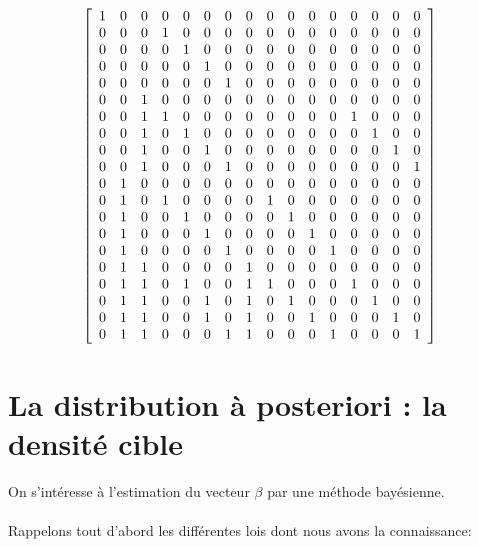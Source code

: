 \documentclass[french,12pt]{report}
\newcommand{\<}{\langle}
\renewcommand{\>}{\rangle}
\theoremstyle{definition}
\begin{document}
$$
\left[
\begin{array}{*{16}c}
 1 & 0 & 0 & 0 & 0 & 0 & 0 & 0 & 0 & 0 & 0 & 0 & 0 & 0 & 0 & 0  \\
 0 & 0 & 0 & 1 & 0 & 0 & 0 & 0 & 0 & 0 & 0 & 0 & 0 & 0 & 0 & 0 \\
 0 & 0 & 0 & 0 & 1 & 0 & 0 & 0 & 0 & 0 & 0 & 0 & 0 & 0 & 0 & 0 \\
 0 & 0 & 0 & 0 & 0 & 1 & 0 & 0 & 0 & 0 & 0 & 0 & 0 & 0 & 0 & 0 \\
 0 & 0 & 0 & 0 & 0 & 0 & 1 & 0 & 0 & 0 & 0 & 0 & 0 & 0 & 0 & 0 \\
 0 & 0 & 1 & 0 & 0 & 0 & 0 & 0 & 0 & 0 & 0 & 0 & 0 & 0 & 0 & 0 \\
 0 & 0 & 1 & 1 & 0 & 0 & 0 & 0 & 0 & 0 & 0 & 0 & 1 & 0 & 0 & 0 \\
 0 & 0 & 1 & 0 & 1 & 0 & 0 & 0 & 0 & 0 & 0 & 0 & 0 & 1 & 0 & 0 \\
 0 & 0 & 1 & 0 & 0 & 1 & 0 & 0 & 0 & 0 & 0 & 0 & 0 & 0 & 1 & 0 \\
 0 & 0 & 1 & 0 & 0 & 0 & 1 & 0 & 0 & 0 & 0 & 0 & 0 & 0 & 0 & 1 \\
 0 & 1 & 0 & 0 & 0 & 0 & 0 & 0 & 0 & 0 & 0 & 0 & 0 & 0 & 0 & 0  \\
 0 & 1 & 0 & 1 & 0 & 0 & 0 & 0 & 1 & 0 & 0 & 0 & 0 & 0 & 0 & 0  \\
 0 & 1 & 0 & 0 & 1 & 0 & 0 & 0 & 0 & 1 & 0 & 0 & 0 & 0 & 0 & 0  \\
 0 & 1 & 0 & 0 & 0 & 1 & 0 & 0 & 0 & 0 & 1 & 0 & 0 & 0 & 0 & 0  \\
 0 & 1 & 0 & 0 & 0 & 0 & 1 & 0 & 0 & 0 & 0 & 1 & 0 & 0 & 0 & 0  \\
 0 & 1 & 1 & 0 & 0 & 0 & 0 & 1 & 0 & 0 & 0 & 0 & 0 & 0 & 0 & 0  \\
 0 & 1 & 1 & 0 & 1 & 0 & 0 & 1 & 1 & 0 & 0 & 0 & 1 & 0 & 0 & 0  \\
 0 & 1 & 1 & 0 & 0 & 1 & 0 & 1 & 0 & 1 & 0 & 0 & 0 & 1 & 0 & 0  \\
 0 & 1 & 1 & 0 & 0 & 1 & 0 & 1 & 0 & 0 & 1 & 0 & 0 & 0 & 1 & 0  \\
 0 & 1 & 1 & 0 & 0 & 0 & 1 & 1 & 0 & 0 & 0 & 1 & 0 & 0 & 0 & 1  \\
\end{array}
\right]
$$


\newpage
\section{La distribution à posteriori : la densité cible}

On s'intéresse à l'estimation du vecteur $\beta$ par une méthode bayésienne. \\
\\
Rappelons tout d'abord les différentes lois dont nous avons la connaissance: \\
\end{document}
